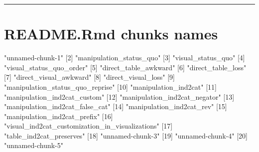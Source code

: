 \begin{center}\rule{0.5\linewidth}{0.5pt}\end{center}

\hypertarget{readme.rmd-chunks-names}{%
\section{README.Rmd chunks names}\label{readme.rmd-chunks-names}}

\begin{Schunk}
\begin{Soutput}
      [1] "unnamed-chunk-1"                               
      [2] "manipulation_status_quo"                       
      [3] "visual_status_quo"                             
      [4] "visual_status_quo_order"                       
      [5] "direct_table_awkward"                          
      [6] "direct_table_loss"                             
      [7] "direct_visual_awkward"                         
      [8] "direct_visual_loss"                            
      [9] "manipulation_status_quo_reprise"               
     [10] "manipulation_ind2cat"                          
     [11] "manipulation_ind2cat_custom"                   
     [12] "manipulation_ind2cat_negator"                  
     [13] "manipulation_ind2cat_false_cat"                
     [14] "manipulation_ind2cat_rev"                      
     [15] "manipulation_ind2cat_prefix"                   
     [16] "visual_ind2cat_customization_in_visualizations"
     [17] "table_ind2cat_preserves"                       
     [18] "unnamed-chunk-3"                               
     [19] "unnamed-chunk-4"                               
     [20] "unnamed-chunk-5"
\end{Soutput}
\end{Schunk}



\address{%
Evangeline Reynolds\\
Affiliation\\%
line 1\\ line 2\\
%
\url{https://journal.r-project.org}\\%
\textit{ORCiD: \href{https://orcid.org/0000-0002-9079-593X}{0000-0002-9079-593X}}\\%
\href{mailto:author1@work}{\nolinkurl{author1@work}}%
}

